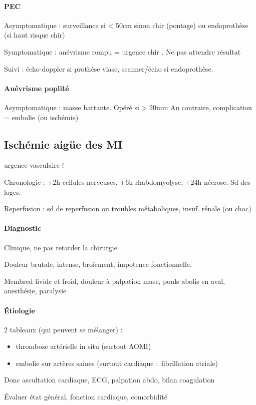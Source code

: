 \documentclass{article}
\begin{document}
\paragraph{PEC}
Asymptomatique : surveillance si \diameter < 50cm sinon chir (pontage) ou
endoprothèse (si haut risque chir)

Symptomatique : \danger anévrisme rompu = urgence chir \danger. Ne pas attendre
résultat

Suivi : écho-doppler si prothèse viasc, scanner/écho si endoprothèse.

\paragraph{Anévrisme poplité}
Asymptomatique : masse battante. Opéré si > 20mm
Au contraire, complication = embolie (ou ischémie)

\subsection{Ischémie aigüe des MI}
\danger urgence vasculaire !

Chronologie : +2h cellules nerveuses, +6h rhabdomyolyse, +24h nécrose. Sd des
loges.

Reperfusion : sd de reperfusion ou troubles métaboliques, insuf. rénale (ou
choc)

\paragraph{Diagnostic} Clinique, ne pas retarder la chirurgie \danger

Douleur brutale, intense, broiement, impotence fonctionnelle. 

Membred livide et froid, douleur à palpation musc, pouls abolis en aval, anesthésie, paralysie

\paragraph{Étiologie} 2 tableaux (qui peuvent se mélanger) :
\begin{itemize}
  \item thrombose artérielle in situ (surtout AOMI)
  \item embolie sur artères saines (surtout cardiaque : fibrillation atriale)
\end{itemize}
Donc ascultation cardiaque, ECG, palpation abdo, bilan coagulation

Évaluer état général, fonction cardiaque, comorbidité
\end{document}
